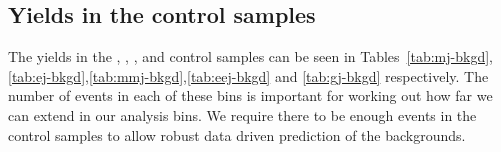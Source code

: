 \begin{table}[h]
\begin{tabular}
\hline\hline
  \end{tabular}
\end{table}

\subsection{Yields in the control samples}

The yields in the \mj, \mmj, \ej, \eej and \gj control samples can be seen in
Tables~\ref{tab:mj-bkgd},\ref{tab:ej-bkgd},\ref{tab:mmj-bkgd},\ref{tab:eej-bkgd}
and \ref{tab:gj-bkgd} respectively. 
The number of events in each of these bins is important for
working out how far we can extend in our analysis bins. We require there to be
enough events in the control samples to allow robust data driven prediction of
the backgrounds.

